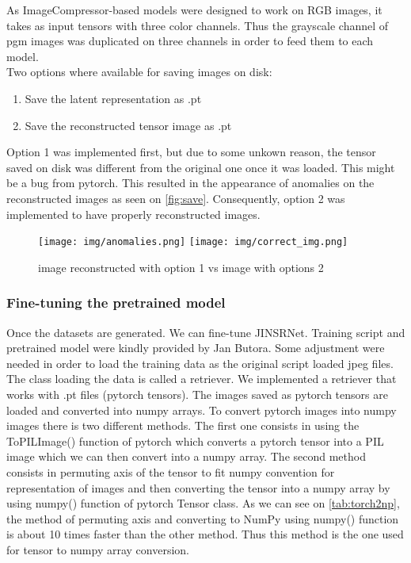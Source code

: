 \documentclass[12pt]{article}
\begin{document}
As ImageCompressor-based models were designed to work on RGB images, it takes as input tensors with three color channels. Thus the grayscale channel of pgm images was duplicated on three channels \autocite{butoraStatisticalModelsImage2017} in order to feed them to each model.\\
Two options where available for saving images on disk:
\begin{enumerate}
    \item Save the latent representation as .pt
    \item Save the reconstructed tensor image as .pt
\end{enumerate}
Option 1 was implemented first, but due to some unkown reason, the tensor saved on disk was different from the original one once it was loaded. This might be a bug from pytorch. This resulted in the appearance of anomalies on the reconstructed images as seen on \autoref{fig:save}. Consequently, option 2 was implemented to have properly reconstructed images.
\begin{figure}[H]
    \texttt{[image: img/anomalies.png]}
    \texttt{[image: img/correct\_img.png]}
    \caption[Image reconstructed from tensor saved on disk]{image reconstructed with option 1 vs image with options 2}
    \label{fig:save}
\end{figure}

\subsubsection{Fine-tuning the pretrained model}
Once the datasets are generated. We can fine-tune JINSRNet.
Training script and pretrained model were kindly provided by Jan Butora. Some adjustment were needed in order to load the training data as the original script loaded jpeg files. The class loading the data is called a retriever. We implemented a retriever that works with .pt files (pytorch tensors). The images saved as pytorch tensors are loaded and converted into numpy arrays. To convert pytorch images into numpy images there is two different methods. The first one consists in using the ToPILImage() function of pytorch which converts a pytorch tensor into a PIL image which we can then convert into a numpy array. The second method consists in permuting axis of the tensor to fit numpy convention for representation of images and then converting the tensor into a numpy array by using numpy() function of pytorch Tensor class. As we can see on \autoref{tab:torch2np}, the method of permuting axis and converting to NumPy using numpy() function is about 10 times faster than the other method. Thus this method is the one used for tensor to numpy array conversion.\\
\end{document}
